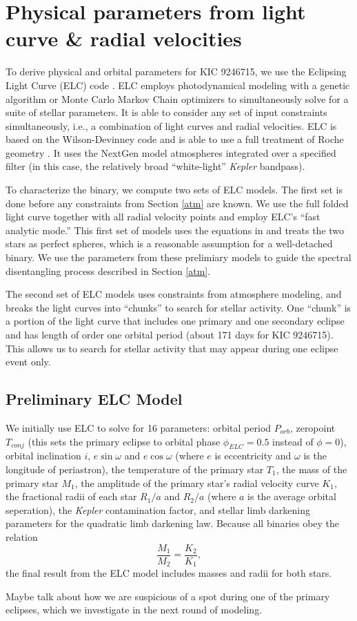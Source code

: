 \section{Physical parameters from light curve \& radial velocities}\label{model}
To derive physical and orbital parameters for KIC 9246715, we use the Eclipsing Light Curve (ELC) code \citep{oro00}. ELC employs photodynamical modeling with a genetic algorithm or Monte Carlo Markov Chain optimizers to simultaneously solve for a suite of stellar parameters. It is able to consider any set of input constraints simultaneously, i.e., a combination of light curves and radial velocities. ELC is based on the Wilson-Devinney code \citep{wil71} and is able to use a full treatment of Roche geometry \citep{avn75}. It uses the NextGen model atmospheres integrated over a specified filter (in this case, the relatively broad ``white-light'' \emph{Kepler} bandpass).

To characterize the binary, we compute two sets of ELC models. The first set is done before any constraints from Section \ref{atm} are known. We use the full folded light curve together with all radial velocity points and employ ELC's ``fast analytic mode.'' This first set of models uses the equations in \citet{gim06} and treats the two stars as perfect spheres, which is a reasonable assumption for a well-detached binary. We use the parameters from these prelimiary models to guide the spectral disentangling process described in Section \ref{atm}.

The second set of ELC models uses constraints from atmosphere modeling, and breaks the light curves into ``chunks'' to search for stellar activity. One ``chunk'' is a portion of the light curve that includes one primary and one secondary eclipse and has length of order one orbital period (about 171 days for KIC 9246715). This allows us to search for stellar activity that may appear during one eclipse event only. %

\subsection{Preliminary ELC Model}

We initially use ELC to solve for 16 parameters: orbital period $P_{orb}$, zeropoint $T_{conj}$ (this sets the primary eclipse to orbital phase $\phi_{ELC} = 0.5$ instead of $\phi = 0$), orbital inclination $i$, $e \sin \omega$ and $e \cos \omega$ (where $e$ is eccentricity and $\omega$ is the longitude of periastron), the temperature of the primary star $T_1$, the mass of the primary star $M_1$, the amplitude of the primary star's radial velocity curve $K_1$, the fractional radii of each star $R_1/a$ and $R_2/a$ (where $a$ is the average orbital seperation), the \emph{Kepler} contamination factor, and stellar limb darkening parameters for the quadratic limb darkening law. Because all binaries obey the relation
\begin{equation}
\frac{M_1}{M_2} = \frac{K_2}{K_1},
\end{equation}
the final result from the ELC model includes masses and radii for both stars.

Maybe talk about how we are suspicious of a spot during one of the primary eclipses, which we investigate in the next round of modeling.
